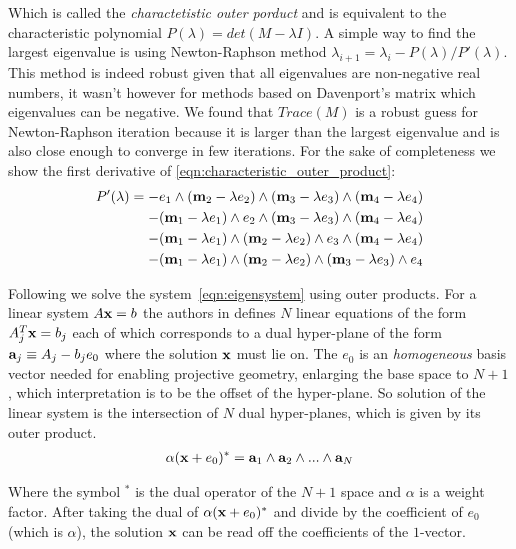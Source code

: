 \documentclass{birkjour}
\numberwithin{equation}{section}
\begin{document}
Which is called the \emph{charactetistic outer porduct} and is equivalent to the characteristic polynomial $P(\lambda) = det(M - \lambda I)$. A simple way to find the largest eigenvalue is using Newton-Raphson method $\lambda_{i+1} = \lambda_i - P(\lambda) / P'(\lambda)$. This method is indeed robust given that all eigenvalues are non-negative real numbers, it wasn't however for methods based on Davenport's matrix \cite{Davenport1968} which eigenvalues can be negative. We found that $Trace(M)$ is a robust guess for Newton-Raphson iteration because it is larger than the largest eigenvalue and is also close enough to converge in few iterations. For the sake of completeness we show the first derivative of \ref{eqn:characteristic_outer_product}:
\begin{eqnarray*}
P'(\lambda) = 
- e_1\wedge(\textbf m_2 - \lambda e_2)\wedge(\textbf m_3 - \lambda e_3)\wedge(\textbf m_4- \lambda e_4)\\
- (\textbf m_1 - \lambda e_1)\wedge e_2\wedge(\textbf m_3 - \lambda e_3)\wedge(\textbf m_4- \lambda e_4)\\
- (\textbf m_1 - \lambda e_1)\wedge(\textbf m_2 - \lambda e_2)\wedge e_3\wedge(\textbf m_4- \lambda e_4)\\
- (\textbf m_1 - \lambda e_1)\wedge(\textbf m_2 - \lambda e_2)\wedge(\textbf m_3 - \lambda e_3)\wedge e_4
\end{eqnarray*}

Following \cite{DeKeninck2019} we solve the system~\ref{eqn:eigensystem} using outer products. For a linear system $A \textbf x = b$ the authors in \cite{DeKeninck2019} defines $N$ linear equations of the form $A^T_j \textbf x = b_j$ each of which corresponds to a dual hyper-plane of the form $\textbf a_j \equiv A_j - b_j e_0$ where the solution $\textbf x$ must lie on. The $e_0$ is an \emph{homogeneous} basis vector needed for enabling projective geometry, enlarging the base space to $N+1$, which interpretation is to be the offset of the hyper-plane. So solution of the linear system is the intersection of $N$ dual hyper-planes, which is given by its outer product.
\begin{eqnarray}
\alpha (\textbf x + e_0)^* = \textbf a_1 \wedge \textbf a_2 \wedge ... \wedge \textbf a_N
\end{eqnarray}

Where the symbol $^*$ is the dual operator of the $N+1$ space and $\alpha$ is a weight factor. After taking the dual of $\alpha (\textbf x + e_0)^*$ and divide by the coefficient of $e_0$ (which is $\alpha$), the solution $\textbf x$ can be read off the coefficients of the $1$-vector.
\end{document}
